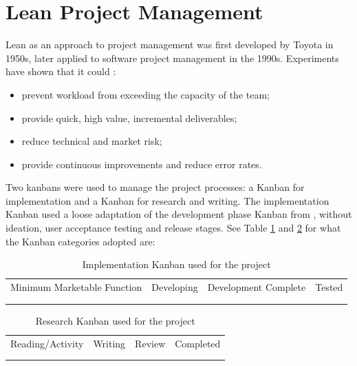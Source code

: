 \section{Lean Project Management}

Lean as an approach to project management was first developed by Toyota in 1950s, later 
applied to software project management in the 1990s. Experiments have shown that it could \citep[p.30]{middleton2012lean}: 

\begin{itemize}
    \setlength\itemsep{0em}    
    \item prevent workload from exceeding the capacity of the team;
    \item provide quick, high value, incremental deliverables;
    \item reduce technical and market risk;
    \item provide continuous improvements and reduce error rates.
\end{itemize}

Two kanbans were used to manage the project processes: a Kanban for implementation and 
a Kanban for research and writing. The implementation Kanban used
a loose adaptation of the development phase Kanban from \citet[p.25]{middleton2012lean}, 
without ideation, user acceptance testing and release stages.
See Table \ref{table:kanban-implementation} and \ref{table:kanban-research} for what the Kanban categories adopted are:
\\
\begin{table}[!ht] 
    \caption{Implementation Kanban used for the project}
    \centering
    \label{table:kanban-implementation}
    \begin{tabular}{|c|c|c|c|}
        \hline
        Minimum Marketable Function & Developing & Development Complete & Tested \\
        &&&\\
        &&&\\
        \hline
    \end{tabular}
\end{table}
\begin{table}[!ht] 
    \caption{Research Kanban used for the project}
    \centering
    \label{table:kanban-research}
    \begin{tabular}{|c|c|c|c|}
        \hline
        Reading/Activity & Writing & Review & Completed\\
        &&&\\
        &&&\\        
        \hline
    \end{tabular}
\end{table}

